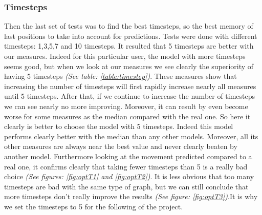 \documentclass[a4]{article}
\begin{document}
\subsubsection{Timesteps}
Then the last set of tests was to find the best timesteps, so the best memory of last positions to take into account for predictions. Tests were done with different timesteps: 1,3,5,7 and 10 timesteps. It resulted that 5 timesteps are better with our measures. Indeed for this particular user, the model with more timesteps seems good, but when we look at our measures we see clearly the superiority of having 5 timesteps \textit{(See table: \ref{table:timestep})}.
These measures show that increasing the number of timesteps will first rapidly increase nearly all measures until 5 timesteps. After that, if we continue to increase the number of timesteps we can see nearly no more improving. Moreover, it can result by even become worse for some measures as the median compared with the real one. So here it clearly is better to choose the model with 5 timesteps. Indeed this model performs clearly better with the median than any other models. Moreover, all its other measures are always near the best value and never clearly beaten by another model. Furthermore looking at the movement predicted compared to a real one, it confirms clearly that taking fewer timesteps than 5 is a really bad choice \textit{(See figures: \ref{fig:optT1} and \ref{fig:optT2})}.
It is less obvious that too many timesteps are bad with the same type of graph, but we can still conclude that more timesteps don't really improve the results \textit{(See figure: \ref{fig:optT3})}.It is why we set the timesteps to 5 for the following of the project.
\end{document}
